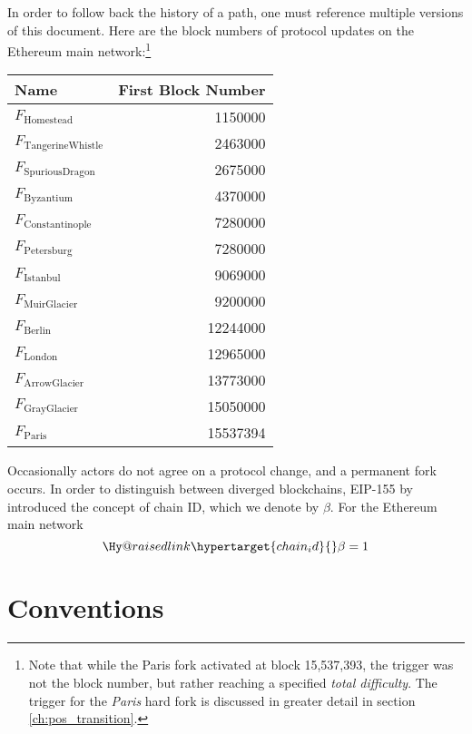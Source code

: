 \documentclass[9pt,oneside]{amsart}
\makeatletter
\newcommand{\linkdest}[1]{\Hy@raisedlink{\hypertarget{#1}{}}}
\makeatother
\begin{document}
\begin{multicols}{2}
In order to follow back the history of a path, one must reference multiple versions of this document.
Here are the block numbers of protocol updates on the Ethereum main network:\footnote{Note that while the Paris fork activated at block 15,537,393, the trigger was not the block number, but rather reaching a specified \textit{total difficulty}. The trigger for the \textit{Paris} hard fork is discussed in greater detail in section \ref{ch:pos_transition}.}
\par
\begin{center}
\begin{tabular}{lr}
\toprule
Name & First Block Number \\
\midrule
$F_{\mathrm{Homestead}}$         &  1150000 \\
$F_{\mathrm{Tangerine Whistle}}$ &  2463000 \\
$F_{\mathrm{Spurious Dragon}}$   &  2675000 \\
$F_{\mathrm{Byzantium}}$         &  4370000 \\
$F_{\mathrm{Constantinople}}$    &  7280000 \\
$F_{\mathrm{Petersburg}}$        &  7280000 \\
$F_{\mathrm{Istanbul}}$          &  9069000 \\
$F_{\mathrm{Muir Glacier}}$      &  9200000 \\
$F_{\mathrm{Berlin}}$            & 12244000 \\
$F_{\mathrm{London}}$            & 12965000 \\
$F_{\mathrm{Arrow Glacier}}$     & 13773000 \\
$F_{\mathrm{Gray Glacier}}$      & 15050000 \\
$F_{\mathrm{Paris}}$             & 15537394 \\
\bottomrule
\end{tabular}
\end{center}
\par

Occasionally actors do not agree on a protocol change, and a permanent fork occurs.
In order to distinguish between diverged blockchains, EIP-155 by \cite{EIP-155} introduced the concept of chain ID, which we denote by $\beta$.
For the Ethereum main network
\begin{equation}
  \linkdest{chain_id}
  \beta = 1
\end{equation}

\section{Conventions}\label{ch:conventions}


\end{multicols}
\end{document}
